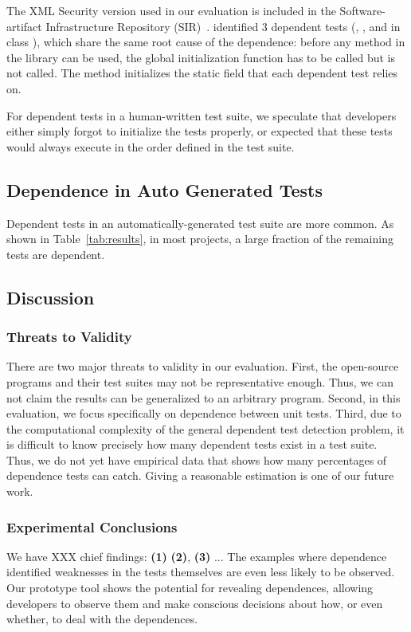 The XML Security version used in our evaluation is included
in the Soft\-ware-artifact
Infrastructure Repository (SIR)~\cite{sir}. \ourtool identified
3 dependent tests (, , and 
in class ), which share the same root
cause of the dependence: before any
method in the library can be used, the global initialization function 
 has to be called but is not called. The
 method initializes the static field that
each dependent test relies on.

For dependent tests in a human-written test suite, we speculate that
developers either simply forgot to
initialize the tests properly, or expected that these tests would always execute
in the order defined
in the test suite.



\subsection{Dependence in Auto Generated Tests}
\label{sec:autotest}

Dependent tests in an automatically-generated test suite
are more common.  As shown in Table~\ref{tab:results}, in most
projects, a large fraction of the remaining tests are dependent.




\subsection{Discussion}

\subsubsection{Threats to Validity}

There are two major threats to validity in our evaluation.
First, the  open-source
programs and their test suites may not be
representative enough. Thus, we can not claim the results
can be generalized to an arbitrary program.
Second, in this evaluation, we focus specifically on
dependence between unit tests.
Third, due to the computational complexity of the general dependent test
detection problem, it is difficult to know precisely how many dependent
tests exist in a test suite. Thus, we do not
yet have empirical data that shows how many percentages of dependence tests
\ourtool can catch.  Giving a reasonable estimation is one of our future work.

\subsubsection{Experimental Conclusions}


We have XXX chief findings: \textbf{(1)}
\textbf{(2)}, \textbf{(3)} ...
The examples where dependence identified weaknesses in the tests themselves
are even less likely to be observed.  
Our prototype tool shows
the potential for revealing dependences, allowing
developers to observe them and make conscious decisions about how, or even whether,
to deal with the dependences. 
